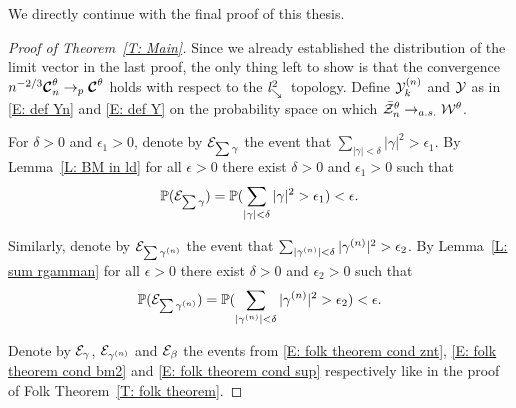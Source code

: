 We directly continue with the final proof of this thesis.

\begin{proof}[Proof of Theorem~\ref{T: Main}]
	Since we already established the distribution of the limit vector in the last proof,
	the only thing left to show is that the convergence $n^{-2 / 3} \boldsymbol{\mathcal{C}}^{\theta}_n \rightarrow_p \boldsymbol{\mathcal{C}}^{\theta}$ holds with respect to the $\mathit{l}^2_{\searrow}$~topology.
	Define ${\mathcal{Y}}^{(n)}_k$ and ${\mathcal{Y}}$ as in \eqref{E: def Yn} and \eqref{E: def Y} on the probability space on which $\bar{\mathcal{Z}}^{\theta}_n \rightarrow_{a.s.} \mathcal{W}^{\theta}$.
	
	For $\delta > 0$ and $\epsilon_1 > 0$, denote by $\mathcal{E}_{\sum\gamma}$ the event that $\sum_{|\gamma| < \delta}|\gamma|^2 > \epsilon_1$.
	By Lemma~\ref{L: BM in ld} for all $\epsilon > 0$ there exist $\delta > 0$ and $\epsilon_1 > 0$ such that
	\begin{equation}
		\mathbb{P}(\mathcal{E}_{\sum\gamma}) = \mathbb{P}( \sum_{|\gamma| < \delta}|\gamma|^2 > \epsilon_1 ) < \epsilon.
	\end{equation}
	
	Similarly, denote by $\mathcal{E}_{\sum\gamma^{(n)}}$ the event that $\sum_{|\gamma^{(n)}| < \delta}|\gamma^{(n)}|^2 > \epsilon_2$.
	By Lemma~\ref{L: sum rgamman} for all $\epsilon > 0$ there exist $\delta > 0$ and $\epsilon_2 > 0$ such that
	\begin{equation}
	\mathbb{P}(\mathcal{E}_{\sum\gamma^{(n)}}) = \mathbb{P}( \sum_{|\gamma^{(n)}| < \delta}|\gamma^{(n)}|^2 > \epsilon_2 ) < \epsilon.
	\end{equation}
	
	Denote by $\mathcal{E}_{\gamma}$, $\mathcal{E}_{\gamma^{(n)}}$ and $\mathcal{E}_{\beta}$ the events from 
	\eqref{E: folk theorem cond znt}, \eqref{E: folk theorem cond bm2} and \eqref{E: folk theorem cond sup} 
	respectively like in the proof of Folk Theorem~\ref{T: folk theorem}.
	

\end{proof}
